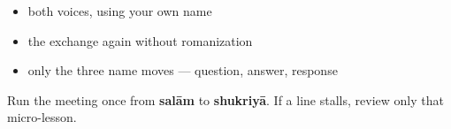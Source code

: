 \begin{itemize}
\raggedright
  \item both voices, using your own name
  \item the exchange again without romanization
  \item only the three name moves — question, answer, response
\end{itemize}

\begin{tcolorbox}[breakable,colback=teal!4,colframe=teal!35!black,title={Before you move on}]
Run the meeting once from \textbf{salām} to \textbf{shukriyā}. If a line stalls, review only that micro-lesson.
\end{tcolorbox}
